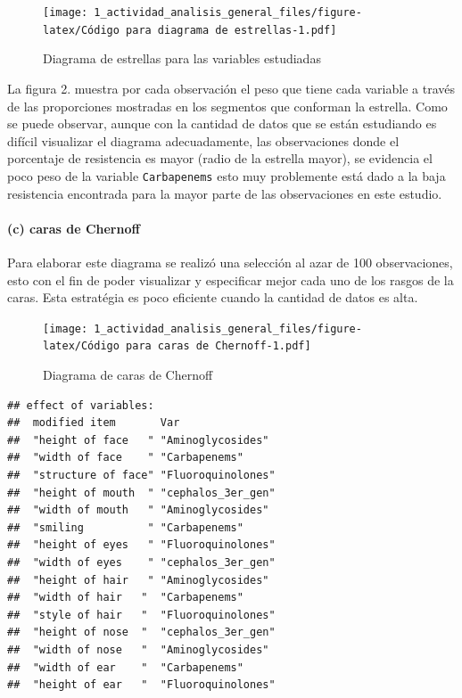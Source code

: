 \documentclass[
]{article}
\begin{document}
\begin{figure}
\centering
\texttt{[image: 1\_actividad\_analisis\_general\_files/figure-latex/Código para diagrama de estrellas-1.pdf]}
\caption{Diagrama de estrellas para las variables estudiadas}
\end{figure}

La figura 2. muestra por cada observación el peso que tiene cada
variable a través de las proporciones mostradas en los segmentos que
conforman la estrella. Como se puede observar, aunque con la cantidad de
datos que se están estudiando es difícil visualizar el diagrama
adecuadamente, las observaciones donde el porcentaje de resistencia es
mayor (radio de la estrella mayor), se evidencia el poco peso de la
variable \texttt{Carbapenems} esto muy problemente está dado a la baja
resistencia encontrada para la mayor parte de las observaciones en este
estudio.

\hypertarget{c-caras-de-chernoff}{%
\paragraph{(c) caras de Chernoff}\label{c-caras-de-chernoff}}

Para elaborar este diagrama se realizó una selección al azar de 100
observaciones, esto con el fin de poder visualizar y especificar mejor
cada uno de los rasgos de la caras. Esta estratégia es poco eficiente
cuando la cantidad de datos es alta.

\begin{figure}
\centering
\texttt{[image: 1\_actividad\_analisis\_general\_files/figure-latex/Código para caras de Chernoff-1.pdf]}
\caption{Diagrama de caras de Chernoff}
\end{figure}

\begin{verbatim}
## effect of variables:
##  modified item       Var               
##  "height of face   " "Aminoglycosides" 
##  "width of face    " "Carbapenems"     
##  "structure of face" "Fluoroquinolones"
##  "height of mouth  " "cephalos_3er_gen"
##  "width of mouth   " "Aminoglycosides" 
##  "smiling          " "Carbapenems"     
##  "height of eyes   " "Fluoroquinolones"
##  "width of eyes    " "cephalos_3er_gen"
##  "height of hair   " "Aminoglycosides" 
##  "width of hair   "  "Carbapenems"     
##  "style of hair   "  "Fluoroquinolones"
##  "height of nose  "  "cephalos_3er_gen"
##  "width of nose   "  "Aminoglycosides" 
##  "width of ear    "  "Carbapenems"     
##  "height of ear   "  "Fluoroquinolones"
\end{verbatim}
\end{document}
